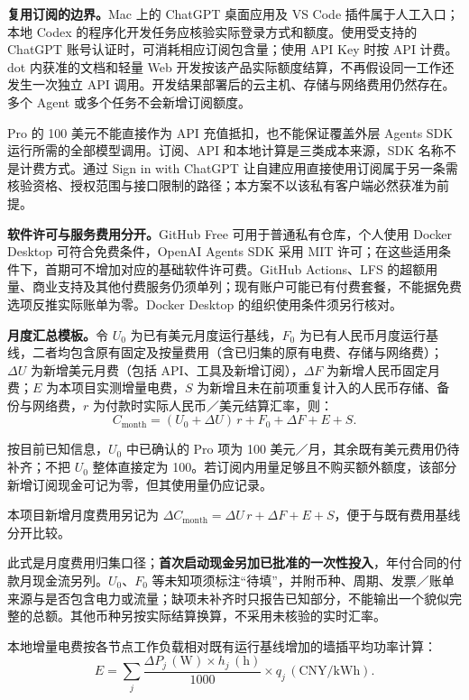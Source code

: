 \documentclass[11pt,a4paper]{article}
\begin{document}
\textbf{复用订阅的边界。}Mac 上的 ChatGPT 桌面应用及 VS Code 插件属于人工入口；本地 Codex 的程序化开发任务应核验实际登录方式和额度。使用受支持的 ChatGPT 账号认证时，可消耗相应订阅包含量；使用 API Key 时按 API 计费。dot 内获准的文档和轻量 Web 开发按该产品实际额度结算，不再假设同一工作还发生一次独立 API 调用。开发结果部署后的云主机、存储与网络费用仍然存在。多个 Agent 或多个任务不会新增订阅额度。\cite{v121-codex-auth,v121-codex-exec,v121-plan-usage}

Pro 的 100 美元不能直接作为 API 充值抵扣，也不能保证覆盖外层 Agents SDK 运行所需的全部模型调用。订阅、API 和本地计算是三类成本来源，SDK 名称不是计费方式。通过 Sign in with ChatGPT 让自建应用直接使用订阅属于另一条需核验资格、授权范围与接口限制的路径；本方案不以该私有客户端必然获准为前提。\cite{v121-plan-quickstart}

\textbf{软件许可与服务费用分开。}GitHub Free 可用于普通私有仓库，个人使用 Docker Desktop 可符合免费条件，OpenAI Agents SDK 采用 MIT 许可；在这些适用条件下，首期可不增加对应的基础软件许可费。GitHub Actions、LFS 的超额用量、商业支持及其他付费服务仍须单列；现有账户可能已有付费套餐，不能据免费选项反推实际账单为零。Docker Desktop 的组织使用条件须另行核对。\cite{budget-github-plans,budget-github-actions,budget-github-lfs,budget-docker-license,budget-sdk-license}

\textbf{月度汇总模板。}令 $U_0$ 为已有美元月度运行基线，$F_0$ 为已有人民币月度运行基线，二者均包含原有固定及按量费用（含已归集的原有电费、存储与网络费）；$\Delta U$ 为新增美元月费（包括 API、工具及新增订阅），$\Delta F$ 为新增人民币固定月费；$E$ 为本项目实测增量电费，$S$ 为新增且未在前项重复计入的人民币存储、备份与网络费，$r$ 为付款时实际人民币／美元结算汇率，则：
\[
C_{\mathrm{month}}=(U_0+\Delta U)\,r+F_0+\Delta F+E+S.
\]

按目前已知信息，$U_0$ 中已确认的 Pro 项为 100 美元／月，其余既有美元费用仍待补齐；不把 $U_0$ 整体直接定为 100。若订阅内用量足够且不购买额外额度，该部分新增订阅现金可记为零，但其使用量仍应记录。

本项目新增月度费用另记为 $\Delta C_{\mathrm{month}}=\Delta U\,r+\Delta F+E+S$，便于与既有费用基线分开比较。

此式是月度费用归集口径；\textbf{首次启动现金另加已批准的一次性投入}，年付合同的付款月现金流另列。$U_0$、$F_0$ 等未知项须标注“待填”，并附币种、周期、发票／账单来源与是否包含电力或流量；缺项未补齐时只报告已知部分，不能输出一个貌似完整的总额。其他币种另按实际结算换算，不采用未核验的实时汇率。

本地增量电费按各节点工作负载相对既有运行基线增加的墙插平均功率计算：
\[
E=\sum_j \frac{\Delta P_j\,(\mathrm{W})\times h_j\,(\mathrm{h})}{1000}
       \times q_j\,(\mathrm{CNY/kWh}).
\]
\end{document}

